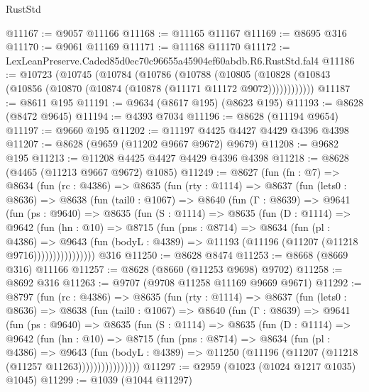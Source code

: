 \begin{lexlean}{RustStd}
\begin{coremodule}
@11167 := @9057 @11166
@11168 := @11165 @11167
@11169 := @8695 @316
@11170 := @9061 @11169
@11171 := @11168 @11170
@11172 := LexLeanPreserve.Caded85d0ec70c96655a45904ef60abdb.R6.RustStd.fal4
@11186 := @10723
    (@10745
      (@10784
        (@10786
          (@10788
            (@10805 (@10828 (@10843 (@10856 (@10870 (@10874 (@10878 (@11171 @11172 @9072))))))))))))
@11187 := @8611 @195
@11191 := @9634 (@8617 @195) (@8623 @195)
@11193 := @8628 (@8472 @9645)
@11194 := @4393 @7034
@11196 := @8628 (@11194 @9654)
@11197 := @9660 @195
@11202 := @11197 @4425 @4427 @4429 @4396 @4398
@11207 := @8628 (@9659 (@11202 @9667 @9672) @9679)
@11208 := @9682 @195
@11213 := @11208 @4425 @4427 @4429 @4396 @4398
@11218 := @8628 (@4465 (@11213 @9667 @9672) @1085)
@11249 := @8627
    (fun (fn : @7) =>
    @8634
      (fun (rc : @4386) =>
      @8635
        (fun (rty : @1114) =>
        @8637
          (fun (lets0 : @8636) =>
          @8638
            (fun (tail0 : @1067) =>
            @8640
              (fun (Γ : @8639) =>
              @9641
                (fun (ps : @9640) =>
                @8635
                  (fun (S : @1114) =>
                  @8635
                    (fun (D : @1114) =>
                    @9642
                      (fun (hn : @10) =>
                      @8715
                        (fun (pns : @8714) =>
                        @8634
                          (fun (pl : @4386) =>
                          @9643
                            (fun (bodyL : @4389) =>
                            @11193 (@11196 (@11207 (@11218 @9716))))))))))))))))
    @316
@11250 := @8628 @8474
@11253 := @8668 (@8669 @316) @11166
@11257 := @8628 (@8660 (@11253 @9698) @9702)
@11258 := @8692 @316
@11263 := @9707 (@9708 @11258 @11169 @9669 @9671)
@11292 := @8797
    (fun (rc : @4386) =>
    @8635
      (fun (rty : @1114) =>
      @8637
        (fun (lets0 : @8636) =>
        @8638
          (fun (tail0 : @1067) =>
          @8640
            (fun (Γ : @8639) =>
            @9641
              (fun (ps : @9640) =>
              @8635
                (fun (S : @1114) =>
                @8635
                  (fun (D : @1114) =>
                  @9642
                    (fun (hn : @10) =>
                    @8715
                      (fun (pns : @8714) =>
                      @8634
                        (fun (pl : @4386) =>
                        @9643
                          (fun (bodyL : @4389) =>
                          @11250 (@11196 (@11207 (@11218 (@11257 @11263))))))))))))))))
@11297 := @2959 (@1023 (@1024 @1217 @1035) @1045)
@11299 := @1039 (@1044 @11297)

\end{coremodule}
\end{lexlean}
